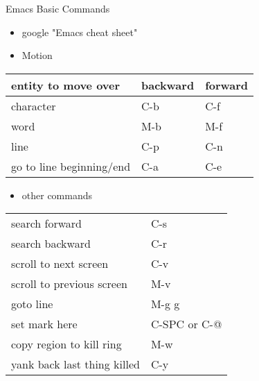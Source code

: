\documentclass[presentation]{beamer}
\begin{document}
\begin{frame}[label=sec-8]{Emacs Basic Commands}
\begin{itemize}
\item google "\alert{Emacs cheat sheet}"
\item Motion
\end{itemize}
\begin{center}
\begin{tabular}{lll}
\hline
entity to move over & backward & forward\\
\hline
character & C-b & C-f\\
word & M-b & M-f\\
line & C-p & C-n\\
go to line beginning/end & C-a & C-e\\
\hline
\end{tabular}
\end{center}
\begin{itemize}
\item other commands
\end{itemize}
\begin{center}
\begin{tabular}{ll}
\hline
search forward & C-s\\
search backward & C-r\\
scroll to next screen & C-v\\
scroll to previous screen & M-v\\
goto line & M-g g\\
set mark here & C-SPC or C-@\\
copy region to kill ring & M-w\\
yank back last thing killed & C-y\\
\hline
\end{tabular}
\end{center}
\end{frame}
\end{document}
